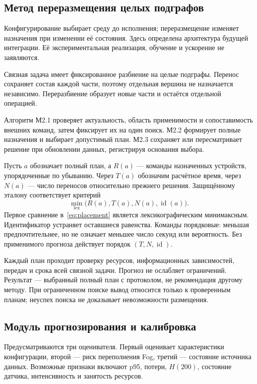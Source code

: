\documentclass{psta}
\begin{document}
\subsection{Метод переразмещения целых подграфов}
Конфигурирование выбирает среду до исполнения; переразмещение изменяет назначения при изменении её состояния. Здесь определена архитектура будущей интеграции. Её экспериментальная реализация, обучение и ускорение не заявляются.

Связная задача имеет фиксированное разбиение на целые подграфы. Перенос сохраняет состав каждой части, поэтому отдельная вершина не назначается независимо. Переразбиение образует новые части и остаётся отдельной операцией.

Алгоритм М2.1 проверяет актуальность, область применимости и сопоставимость внешних команд, затем фиксирует их на один поиск. М2.2 формирует полные назначения и выбирает допустимый план. М2.3 сохраняет или пересматривает решение при обновлении данных, регистрируя основания выбора.

Пусть $a$ обозначает полный план, а $R(a)$ --- команды назначенных устройств, упорядоченные по убыванию. Через $T(a)$ обозначим расчётное время, через $N(a)$ --- число переносов относительно прежнего решения. Защищённому эталону соответствует критерий
\begin{equation}\label{eq:placement}
 \min_{\mathrm{lex}}\bigl(R(a),T(a),N(a),\operatorname{id}(a)\bigr).
\end{equation}
Первое сравнение в~\eqref{eq:placement} является лексикографическим минимаксным. Идентификатор устраняет оставшиеся равенства. Команды порядковые: меньшая предпочтительнее, но не означает меньшее число секунд или вероятность. Без применимого прогноза действует порядок $(T,N,\operatorname{id})$.

Каждый план проходит проверку ресурсов, информационных зависимостей, передач и срока всей связной задачи. Прогноз не ослабляет ограничений. Результат --- выбранный полный план с протоколом, не рекомендация другому методу. При ограниченном поиске вывод относится только к проверенным планам; неуспех поиска не доказывает невозможности размещения.

\subsection{Модуль прогнозирования и калибровка}
Предусматриваются три оценивателя. Первый оценивает характеристики конфигурации, второй --- риск переполнения Fog, третий --- состояние источника данных. Возможные признаки включают p95, потери, $H(200)$, состояние датчика, интенсивность и занятость ресурсов.
\end{document}
